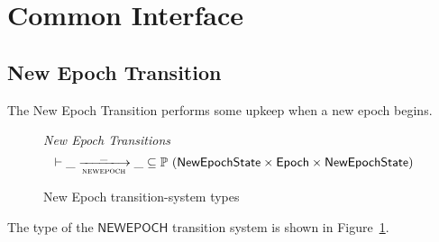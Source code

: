 \section{Common Interface}
\label{sec:common-interface}

\subsection{New Epoch Transition}
\label{sec:newepoch-trans}

The New Epoch Transition performs some upkeep when a new epoch begins.

\begin{figure}[htb]
  \emph{New Epoch Transitions}
  \begin{equation*}
    \vdash \var{\_} \trans{newepoch}{\_} \var{\_} \subseteq
    \powerset (\NewEpochState \times \Epoch \times \NewEpochState)
  \end{equation*}
  \caption{New Epoch transition-system types}
  \label{fig:ts-types:newepoch}
\end{figure}

The type of the $\mathsf{NEWEPOCH}$ transition system is shown in Figure~\ref{fig:ts-types:newepoch}.

